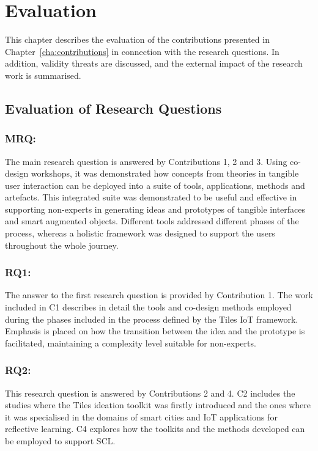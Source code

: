 \chapter{Evaluation}
\label{cha:evaluation}

This chapter describes the evaluation of the contributions presented in Chapter~\ref{cha:contributions} in connection with the research questions. In addition, validity threats are discussed, and the external impact of the research work is summarised.


\section{Evaluation of Research Questions}

\subsection*{MRQ: \MRQ}
\label{mrq}
The main research question is answered by Contributions 1, 2 and 3. Using co-design workshops, it was demonstrated how concepts from theories in tangible user interaction can be deployed into a suite of tools, applications, methods and artefacts. This integrated suite was demonstrated to be useful and effective in supporting non-experts in generating ideas and prototypes of tangible interfaces and smart augmented objects. Different tools addressed different phases of the process, whereas a holistic framework was designed to support the users throughout the whole journey.

\subsection*{RQ1: \RQi}
\label{rq1}
The answer to the first research question is provided by Contribution 1. The work included in C1 describes in detail the tools and co-design methods employed during the phases included in the process defined by the Tiles IoT framework. Emphasis is placed on how the transition between the idea and the prototype is facilitated, maintaining a complexity level suitable for non-experts.

\subsection*{RQ2: \RQii}
\label{rq2}
This research question is answered by Contributions 2 and 4. C2 includes the studies where the Tiles ideation toolkit was firstly introduced and the ones where it was specialised in the domains of smart cities and IoT applications for reflective learning. C4 explores how the toolkits and the methods developed can be employed to support SCL.

